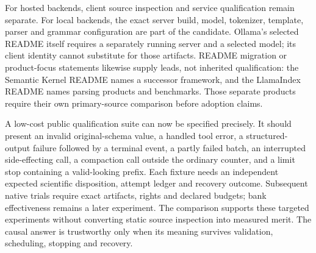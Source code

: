 For hosted backends, client source inspection and service qualification remain separate. For local
backends, the exact server build, model, tokenizer, template, parser and grammar configuration are
part of the candidate. Ollama's selected README itself requires a separately running server and a
selected model; its client identity cannot substitute for those artifacts. README migration or
product-focus statements likewise supply leads, not inherited qualification: the Semantic Kernel
README names a successor framework, and the LlamaIndex README names parsing products and benchmarks.
Those separate products require their own primary-source comparison before adoption claims.
\citep{exec28_dl_ollama,exec28_dl_semantic_kernel,exec28_dl_llama_index}

A low-cost public qualification suite can now be specified precisely. It should present an invalid
original-schema value, a handled tool error, a structured-output failure followed by a terminal event,
a partly failed batch, an interrupted side-effecting call, a compaction call outside the ordinary
counter, and a limit stop containing a valid-looking prefix. Each fixture needs an independent expected
scientific disposition, attempt ledger and recovery outcome. Subsequent native trials require exact
artifacts, rights and declared budgets; bank effectiveness remains a later experiment. The comparison
supports these targeted experiments without converting static source inspection into measured merit.
The causal answer is trustworthy only when its meaning survives validation, scheduling, stopping and recovery.

